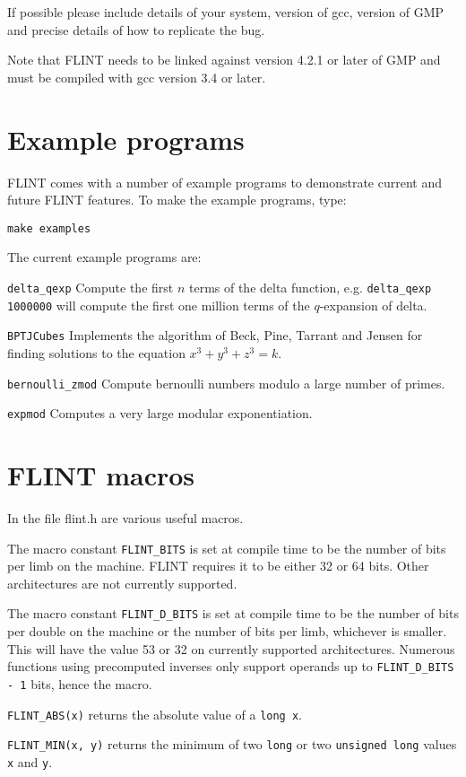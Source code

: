 \documentclass[a4paper,10pt]{article}
\newcommand{\code}{\lstinline}
\begin{document}
If possible please include details of your system, version of gcc, version of GMP and precise details of how to replicate the bug.

Note that FLINT needs to be linked against version 4.2.1 or later of GMP and must be compiled with gcc version 3.4 or later.

\section{Example programs}

FLINT comes with a number of example programs to demonstrate current and future FLINT features. To make the example programs, type:

\code{make examples}

The current example programs are:

\code{delta_qexp} Compute the first $n$ terms of the delta function, e.g. \code{delta_qexp 1000000} will compute the first one million terms of the $q$-expansion of delta.

\code{BPTJCubes} Implements the algorithm of Beck, Pine, Tarrant and Jensen for finding solutions to the equation $x^3+y^3+z^3 = k$.

\code{bernoulli_zmod} Compute bernoulli numbers modulo a large number of primes.

\code{expmod} Computes a very large modular exponentiation.

\section{FLINT macros}
In the file flint.h are various useful macros.

The macro constant \code{FLINT_BITS} is set at compile time to be the number of bits per limb on the machine. FLINT requires it to be either 32 or 64 bits. Other architectures are not currently supported.

The macro constant \code{FLINT_D_BITS} is set at compile time to be the number of bits per double on the machine or the number of bits per limb, whichever is smaller. This will have the value 53 or 32 on currently supported architectures. Numerous functions using precomputed inverses only support operands up to \code{FLINT_D_BITS - 1} bits, hence the macro.

\code{FLINT_ABS(x)} returns the absolute value of a \code{long x}.

\code{FLINT_MIN(x, y)} returns the minimum of two \code{long} or two \code{unsigned long} values \code{x} and \code{y}.
\end{document}
